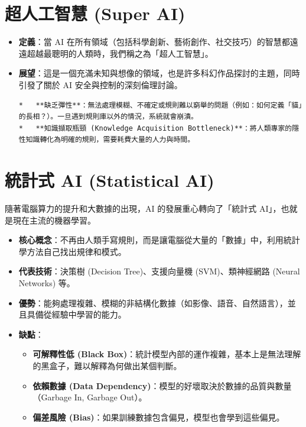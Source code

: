 \documentclass[
  letterpaper,
  DIV=11,
  numbers=noendperiod]{scrreprt}
\providecommand{\tightlist}{%
  \setlength{\itemsep}{0pt}\setlength{\parskip}{0pt}}
\begin{document}
\section{超人工智慧 (Super AI)}\label{sec-super-ai}

\begin{itemize}
\item
  \textbf{定義}：當 AI
  在所有領域（包括科學創新、藝術創作、社交技巧）的智慧都遠遠超越最聰明的人類時，我們稱之為「超人工智慧」。
\item
  \textbf{展望}：這是一個充滿未知與想像的領域，也是許多科幻作品探討的主題，同時引發了關於
  AI 安全與控制的深刻倫理討論。

\begin{verbatim}
*   **缺乏彈性**：無法處理模糊、不確定或規則難以窮舉的問題（例如：如何定義「貓」的長相？）。一旦遇到規則庫以外的情況，系統就會崩潰。
*   **知識擷取瓶頸 (Knowledge Acquisition Bottleneck)**：將人類專家的隱性知識轉化為明確的規則，需要耗費大量的人力與時間。
\end{verbatim}
\end{itemize}

\section{統計式 AI (Statistical AI)}\label{sec-statistical-ai}

隨著電腦算力的提升和大數據的出現，AI 的發展重心轉向了「統計式
AI」，也就是現在主流的機器學習。

\begin{itemize}
\tightlist
\item
  \textbf{核心概念}：不再由人類手寫規則，而是讓電腦從大量的「數據」中，利用統計學方法自己找出規律和模式。
\item
  \textbf{代表技術}：決策樹 (Decision Tree)、支援向量機
  (SVM)、類神經網路 (Neural Networks) 等。
\item
  \textbf{優勢}：能夠處理複雜、模糊的非結構化數據（如影像、語音、自然語言），並且具備從經驗中學習的能力。
\item
  \textbf{缺點}：

  \begin{itemize}
  \tightlist
  \item
    \textbf{可解釋性低 (Black
    Box)}：統計模型內部的運作複雜，基本上是無法理解的黑盒子，難以解釋為何做出某個判斷。
  \item
    \textbf{依賴數據 (Data
    Dependency)}：模型的好壞取決於數據的品質與數量（Garbage In, Garbage
    Out）。
  \item
    \textbf{偏差風險
    (Bias)}：如果訓練數據包含偏見，模型也會學到這些偏見。
  \end{itemize}
\end{itemize}
\end{document}

